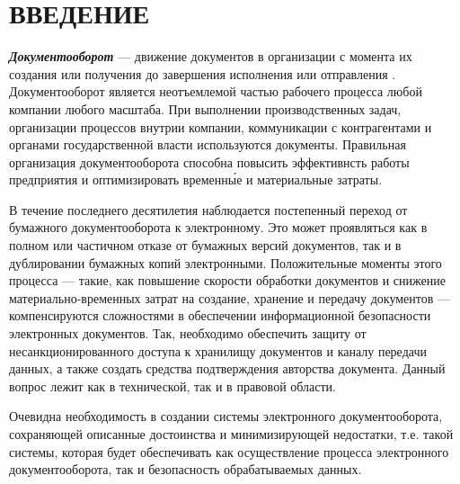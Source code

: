 \chapter*{ВВЕДЕНИЕ}							%

\textbf{\textit{Документооборот}} --- движение документов в организации с момента их создания или получения до завершения исполнения или отправления \cite{gost51141}.
Документооборот является неотъемлемой частью рабочего процесса любой компании любого масштаба. При выполнении производственных задач, организации процессов внутрии компании, коммуникации с контрагентами и органами государственной власти используются документы. Правильная организация документооборота способна повысить эффективнсть работы предприятия и оптимизировать временн\'{ы}е и материальные затраты.

\vspace{\baselineskip}
В течение последнего десятилетия наблюдается постепенный переход от бумажного документооборота к электронному. Это может проявляться как в полном или частичном отказе от бумажных версий документов, так и в дублировании бумажных копий электронными. Положительные моменты этого процесса --- такие, как повышение скорости обработки документов и снижение материально-временных затрат на создание, хранение и передачу документов --- компенсируются сложностями в обеспечении информационной безопасности электронных документов. Так, необходимо обеспечить защиту от несанкционированного доступа к хранилищу документов и каналу передачи данных, а также создать средства подтверждения авторства документа. Данный вопрос лежит как в технической, так и в правовой области.

\vspace{\baselineskip}
Очевидна необходимость в создании системы электронного документооборота, сохраняющей описанные достоинства и минимизирующей недостатки, т.е. такой системы, которая будет обеспечивать как осуществление процесса электронного документооборота, так и безопасность обрабатываемых данных.

